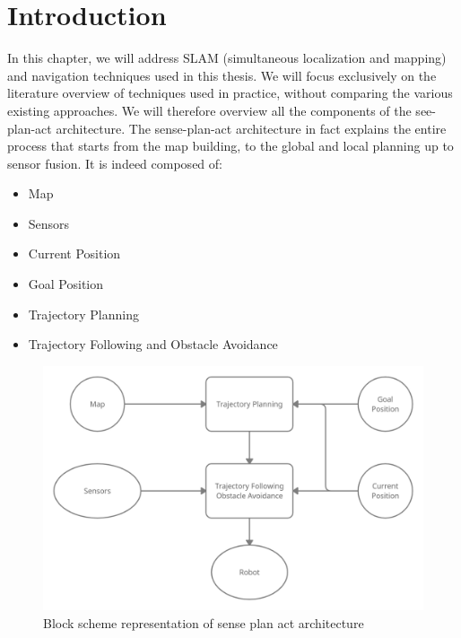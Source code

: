 \section{Introduction}
In this chapter, we will address SLAM (simultaneous localization and mapping) and navigation techniques used in this thesis. We will focus exclusively on the literature overview of techniques used in practice, without comparing the various existing approaches. We will therefore overview all the components of the see-plan-act architecture.
The sense-plan-act architecture in fact explains the entire process that starts from the map building, to the global and local planning up to sensor fusion.
It is indeed composed of:
\begin{itemize}
    \item Map
    \item Sensors 
    \item Current Position
    \item Goal Position
    \item Trajectory Planning
    \item Trajectory Following and Obstacle Avoidance
\end{itemize}

\begin{figure}[H]
    \centering
    \includegraphics[scale=0.21]{Images/Chapter 4/senseplanact.png}
    \caption{Block scheme representation of sense plan act architecture}
    \label{fig:my_label}
\end{figure}

